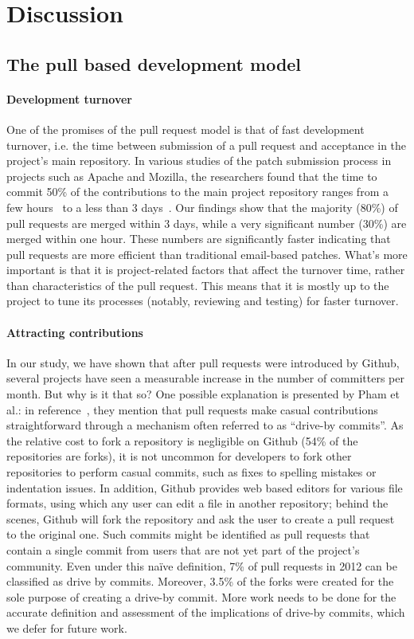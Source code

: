 \documentclass{sig-alternate}
\begin{document}
\section{Discussion}
\label{sec:discussion}

\subsection{The pull based development model}

\paragraph{Development turnover} One of the promises of the pull request model
is that of fast development turnover, i.e. the time between submission of a pull
request and acceptance in the project's main repository.  In various studies of
the patch submission process in projects such as Apache and Mozilla, the
researchers found that the time to commit 50\% of the contributions to the main
project repository ranges from a few hours~\cite{Rigby08} to a less than 3
days~\cite{Weiss08, Baysal12}. Our findings show that the majority (80\%) of
pull requests are merged within 3 days, while a very significant number (30\%)
are merged within one hour. These numbers are significantly faster indicating
that pull requests are more efficient than traditional email-based patches.
What's more important is that it is project-related factors that affect the
turnover time, rather than characteristics of the pull request. This means that
it is mostly up to the project to tune its processes (notably, reviewing and
testing) for faster turnover.  

\paragraph{Attracting contributions}
In our study, we have shown that after pull requests were introduced
by Github, several projects have seen a measurable increase in the number
of committers per month. But why is it that so? One possible explanation
is presented by Pham et al.: in reference~\cite{Pham13}, they mention
that pull requests make casual contributions straightforward through
a mechanism often referred to as ``drive-by commits''. As the
relative cost to fork a repository is negligible on Github (54\% of the
repositories are forks), it is not uncommon for developers to fork other
repositories to perform casual commits, such as fixes to spelling mistakes or
indentation issues. In addition, Github provides web based editors
for various file formats, using which any user can edit a file in another
repository; behind the scenes, Github will fork the repository and ask the user
to create a pull request to the original one. Such commits might be identified
as pull requests that contain a single commit from users that are not yet part
of the project's community. Even under this na\"ive definition, 7\% of pull
requests in 2012 can be classified as drive by commits. Moreover, 3.5\% of the
forks were created for the sole purpose of creating a drive-by commit. More
work needs to be done for the accurate definition and assessment of the
implications of drive-by commits, which we defer for future work.
\end{document}
